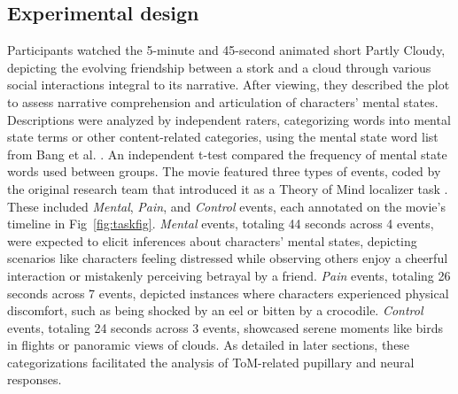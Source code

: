 
\subsection*{Experimental design }
Participants watched the 5-minute and 45-second animated short Partly Cloudy, depicting the evolving friendship between a stork and a cloud through various social interactions integral to its narrative. After viewing, they described the plot to assess narrative comprehension and articulation of characters' mental states. Descriptions were analyzed by independent raters, categorizing words into mental state terms or other content-related categories, using the mental state word list from Bang et al. \citep{bang2013}. An independent t-test compared the frequency of mental state words used between groups. The movie featured three types of events, coded by the original research team that introduced it as a Theory of Mind localizer task \citep{jacoby2016}. These included \textit{Mental}, \textit{Pain}, and \textit{Control} events, each annotated on the movie's timeline in Fig~\ref{fig:taskfig}. \textit{Mental} events, totaling 44 seconds across 4 events, were expected to elicit inferences about characters' mental states, depicting scenarios like characters feeling distressed while observing others enjoy a cheerful interaction or mistakenly perceiving betrayal by a friend. \textit{Pain} events, totaling 26 seconds across 7 events, depicted instances where characters experienced physical discomfort, such as being shocked by an eel or bitten by a crocodile. \textit{Control} events, totaling 24 seconds across 3 events, showcased serene moments like birds in flights or panoramic views of clouds. As detailed in later sections, these categorizations facilitated the analysis of ToM-related pupillary and neural responses.


